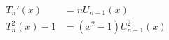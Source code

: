 \begin{equation}
 \begin{split}
  T_{n}'(x)&=n U_{n-1}(x)\\
  T^2_{n}(x)-1 &= (x^2-1) U^2_{n-1}(x)
 \end{split}
\end{equation}

